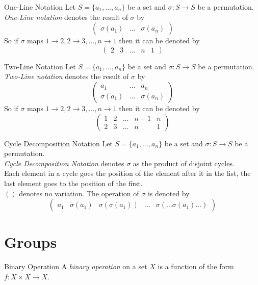 \documentclass[11pt,a4paper]{article}
\begin{document}
\subtitle{Remark 1.06 - }{One-Line Notation}
Let $S = \{a_1, \dots, a_n\}$ be a set and $\sigma : S \to S$ be a permutation.\\
\textit{One-Line notation} denotes the result of $\sigma$ by $$\begin{pmatrix} \sigma(a_1) & \dots & \sigma(a_n) \end{pmatrix}$$
So if $\sigma$ maps $1 \to 2, 2 \to 3, \dots, n \to 1$ then it can be denoted by $$\begin{pmatrix} 2  & 3 & \dots & n & 1 \end{pmatrix}$$

\subtitle{Remark 1.07 - }{Two-Line Notation}
Let $S = \{a_1, \dots, a_n\}$ be a set and $\sigma : S \to S$ be a permutation.\\
\textit{Two-Line notation} denotes the result of $\sigma$ by $$\begin{pmatrix} a_1 & \dots & a_n \\ \sigma(a_1) & \dots & \sigma(a_n) \end{pmatrix}$$
So if $\sigma$ maps $1 \to 2, 2 \to 3, \dots, n \to 1$ then it can be denoted by $$\begin{pmatrix} 1 & 2 & \dots & n-1 & n \\ 2  & 3 & \dots & n & 1 \end{pmatrix}$$

\subtitle{Remark 1.08 - }{Cycle Decomposition Notation}
Let $S = \{a_1, \dots, a_n\}$ be a set and $\sigma : S \to S$ be a permutation.\\
\textit{Cycle Decomposition Notation} denotes $\sigma$ as the product of disjoint cycles.\\
Each element in a cycle goes the position of the element after it in the list, the last element goes to the position of the first.\\
$()$ denotes no variation. The operation of $\sigma$ is denoted by $$\begin{pmatrix} a_1 & \sigma(a_1) & \sigma(\sigma(a_1)) & \dots & \sigma(\dots\sigma(a_1)\dots)\end{pmatrix}$$

\section{Groups}

\subtitle{Definition 2.01 - }{Binary Operation}
A \textit{binary operation} on a set $X$ is a function of the form $f : X \times X \to X$.\\
\end{document}
